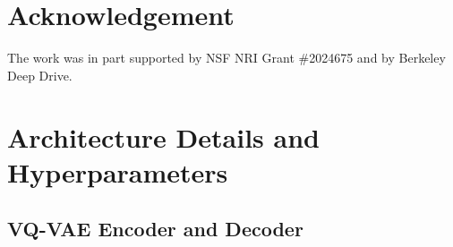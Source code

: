 \documentclass{article}
\begin{document}
 
\section*{Acknowledgement}
The work was in part supported by NSF NRI Grant \#2024675 and by Berkeley Deep Drive. 




\clearpage
\appendix
\onecolumn
\section{Architecture Details and Hyperparameters}
\label{appendix:arch_hyperparams}
\subsection{VQ-VAE Encoder and Decoder}
\end{document}

